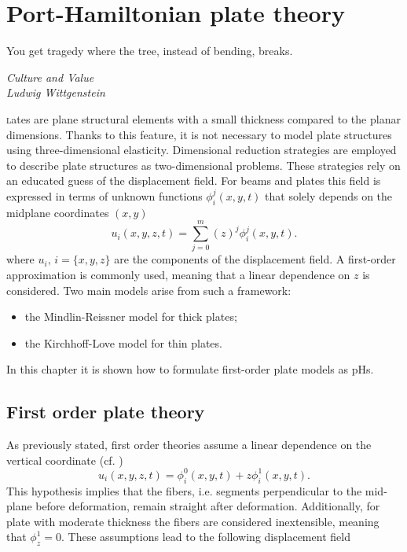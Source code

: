 \chapter{Port-Hamiltonian plate theory}\label{ch:platePH}

\epigraph{You get tragedy where the tree, instead of bending, breaks.}{\textit{Culture and Value\\
Ludwig Wittgenstein}}
\minitoc

\lettrine{\color{theme}{P}}lates are plane structural elements with a small thickness compared to the planar dimensions. Thanks to this feature, it is not necessary to model plate structures using three-dimensional elasticity. Dimensional reduction strategies are employed to describe plate structures as two-dimensional problems. These strategies rely on an educated guess of the displacement field. For beams and plates this field is expressed in terms of unknown functions $\phi_i^j(x,y,t)$ that solely depends on the midplane coordinates $(x,y)$
\begin{equation*}
u_i(x,y,z,t) = \sum_{j=0}^m (z)^j \phi_i^j(x,y,t).
\end{equation*}
where $u_{i}, \, i = \{x, y, z\}$ are the components of the displacement field. A first-order approximation is commonly used, meaning that a linear dependence on $z$ is considered. Two main models arise from such a framework: 
\begin{itemize}
	\item the Mindlin-Reissner model for thick plates;
	\item the Kirchhoff-Love model for thin plates.
\end{itemize}

In this chapter it is shown how to formulate first-order plate models as pHs. 

\section{First order plate theory}
As previously stated, first order theories assume a linear dependence on the vertical coordinate (cf. \cite{reddy2006theory})
\begin{equation*}
u_i(x,y,z,t) = \phi_i^0(x,y,t) + z \phi_i^1(x,y,t).
\end{equation*}
This hypothesis implies that the fibers, i.e. segments perpendicular to the mid-plane before deformation, remain straight after deformation. Additionally, for plate with moderate thickness the fibers are considered inextensible, meaning that $\phi_z^1 = 0$. These assumptions lead to the following displacement field

